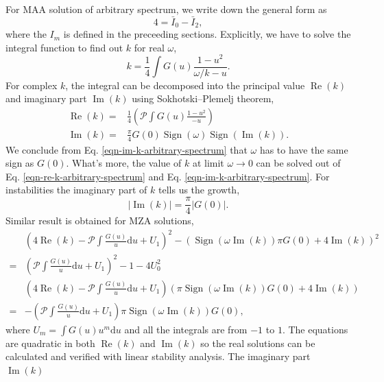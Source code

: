 \documentclass[%
preprint,
 amsmath,amssymb,
 aps,
 prd
]{revtex4-1}
\begin{document}
For MAA solution of arbitrary spectrum, we write down the general form as
\begin{equation}
   4 = \bar I_0 - \bar I_2,
\end{equation}
where the $I_m$ is defined in the preceeding sections. Explicitly, we have to solve the integral function to find out $k$ for real $\omega$,
\begin{equation}
   k = \frac{1}{4} \int G(u) \frac{ 1 - u^2 }{ \omega/k - u }.
\end{equation}
For complex $k$, the integral can be decomposed into the principal value $\operatorname{Re}(k)$ and imaginary part $\operatorname{Im}(k)$ using Sokhotski–Plemelj theorem,
\begin{align}
\operatorname{Re}(k) =& \frac{1}{4}\left(  \mathcal{P} \int G(u) \frac{ 1 - u^2 }{  - u }  \right)\label{eqn-re-k-arbitrary-spectrum} \\
\operatorname{Im}(k) =&  \frac{\pi}{4}G(0) \operatorname{Sign}\left( \omega \right) \operatorname{Sign}\left(  \operatorname{Im}(k)  \right).
\label{eqn-im-k-arbitrary-spectrum}
\end{align}
We conclude from Eq. \eqref{eqn-im-k-arbitrary-spectrum} that $\omega$ has to have the same sign as $G(0)$. What's more, the value of $k$ at limit $\omega\to 0$ can be solved out of Eq. \eqref{eqn-re-k-arbitrary-spectrum} and Eq. \eqref{eqn-im-k-arbitrary-spectrum}. For instabilities the imaginary part of $k$ tells us the growth,
\begin{equation}
   \lvert \operatorname{Im}(k) \rvert  =  \frac{\pi}{4}\lvert G(0)\rvert .
\end{equation}
Similar result is obtained for MZA solutions,
\begin{align}
&\left(4\operatorname{Re}(k) - \mathcal P \int \frac{G(u)}{u} \mathrm d u + U_1 \right)^2  - \left( \operatorname{Sign}(\omega \operatorname{Im}(k) )\pi G(0) +4 \operatorname{Im}(k) \right)^2 \\
=&\left( \mathcal P \int \frac{G(u)}{u} \mathrm d u + U_1 \right)^2 -1 - 4 U_0^2  \\
&\left( 4 \operatorname{Re}(k) - \mathcal P \int \frac{G(u)}{u} \mathrm d u + U_1 \right) \left( \pi \operatorname{Sign}(\omega \operatorname{Im}(k) ) G(0) + 4 \operatorname{Im}(k) \right) \\
=& - \left( \mathcal P \int \frac{G(u)}{u} \mathrm du + U_1 \right) \pi \operatorname{Sign}(\omega \operatorname{Im}(k) ) G(0),
\end{align}
where $U_m = \int G(u) u^m \mathrm du$ and all the integrals are from $-1$ to $1$. The equations are quadratic in both $\operatorname{Re}(k)$ and $\operatorname{Im}(k)$ so the real solutions can be calculated and verified with linear stability analysis. The imaginary part $\operatorname{Im}(k)$
\end{document}
